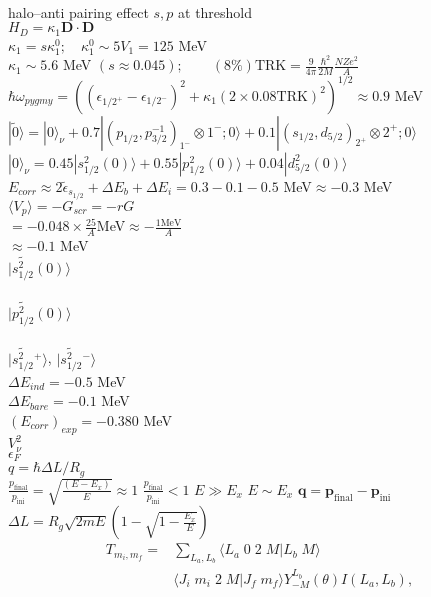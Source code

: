 \documentclass[a4paper,12pt]{book}
\numberwithin{equation}{section}
\numberwithin{figure}{section}
\numberwithin{table}{section}
\begin{document}
\\
halo--anti pairing effect $s,p$ at threshold\\
$H_D=\kappa_1\mathbf D\cdot\mathbf D$\\
$\kappa_1=s\kappa_1^0;\quad\kappa_1^0\sim5V_1=125$ MeV\\
$\kappa_1\sim 5.6$ MeV $(s\approx0.045);\quad \quad (8\%)\text{TRK}=\frac{9}{4\pi}\frac{\hbar^2}{2M}\frac{NZe^2}{A}$\\
$\hbar\omega_{pygmy}=\left((\epsilon_{1/2^+}-\epsilon_{1/2^-})^2+\kappa_1(2\times0.08\text{TRK})^2\right)^{1/2}\approx0.9$ MeV\\
$|\tilde 0\rangle=|0\rangle_\nu+0.7|(p_{1/2},p^{-1}_{3/2})_{1^-}\otimes1^-;0\rangle+0.1|(s_{1/2},d_{5/2})_{2^+}\otimes2^+;0\rangle$\\
$|0\rangle_\nu=0.45|s_{1/2}^2(0)\rangle+0.55|p_{1/2}^2(0)\rangle+0.04|d_{5/2}^2(0)\rangle$\\
$E_{corr}\approx2\tilde\epsilon_{s_{1/2}}+\Delta E_b+\Delta E_i=0.3-0.1-0.5$ MeV$\approx-0.3$ MeV\\
$\langle V_p\rangle=-G_{scr}=-rG$\\
$=-0.048\times\frac{25}{A}$MeV$\approx-\frac{1\text{MeV}}{A}$\\
$\approx-0.1$ MeV\\
$|\widetilde {s^2_{1/2}}(0)\rangle$\\
\\
$|\widetilde {p^2_{1/2}}(0)\rangle$\\
\\

$|\widetilde {s^2_{1/2}}{}^+\rangle$, $|\widetilde {s^2_{1/2}}{}^-	\rangle$\\
$\Delta E_{ind}=-0.5$ MeV\\
$\Delta E_{bare}=-0.1$ MeV\\
$(E_{corr})_{exp}=-0.380$ MeV\\
$V_\nu^2$\\
$\epsilon_F$\\
$q=\hbar\Delta L/R_g$\\
$\frac{p_{\text{final}}}{p_{\text{ini}}}=\sqrt{\frac{(E-E_x)}{E}}\approx 1$
$\frac{p_{\text{final}}}{p_{\text{ini}}}< 1$
$E\gg E_x$
$E\sim E_x$
$\mathbf q=\mathbf p_{\text{final}}-\mathbf p_{\text{ini}}$\\
$\Delta L=R_g\sqrt{2m E}\left(1-\sqrt{1-\frac{E_x}{E}}\right)$
\begin{align}
  T_{m_i,m_f}=&\sum_{L_a,L_b}\langle L_a\;0\;2\;M|L_b\;M\rangle\\
  &\langle J_i\;m_i\;2\;M|J_f\;m_f\rangle Y^{L_b}_{-M} (\theta) I(L_a,L_b),
\end{align}
\end{document}
